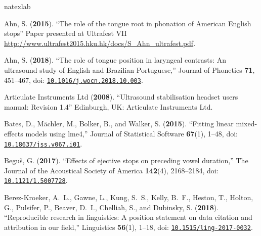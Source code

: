\documentclass[preprint]{JASAnew}
\begin{document}
\begin{thebibliography}{68}
\def\enquote#1{``#1,''}
\def\plainquote#1{``#1''}
\expandafter\ifx\csname natexlab\endcsname\relax\def\natexlab#1{#1}\fi
\providecommand{\dourl}[1]{\href{http://#1}{\nolinkurl{#1}}}
\providecommand{\bibinfo}[2]{#2}
\providecommand{\noopsort}[1]{}
\providecommand{\switchargs}[2]{#2#1}
  \def\eatspace #1{#1}
\providecommand{\dodoi}[1]{doi: \href{http://dx.doi.org/#1}{\nolinkurl{#1}}}

\bibinfo{author}{Ahn, S.} (\textbf{\bibinfo{year}{2015}}).
  \plainquote{\bibinfo{title}{The role of the tongue root in phonation of
  {A}merican {E}nglish stops}} \bibinfo{howpublished}{Paper presented at
  Ultrafest VII
  \url{http://www.ultrafest2015.hku.hk/docs/S_Ahn_ultrafest.pdf}}.

\bibinfo{author}{Ahn, S.} (\textbf{\bibinfo{year}{2018}}).
  \enquote{\bibinfo{title}{The role of tongue position in laryngeal contrasts:
  An ultrasound study of {E}nglish and {B}razilian {P}ortuguese}}
  \bibinfo{journal}{Journal of Phonetics} \textbf{71},
  \bibinfo{pages}{451--467}, \dodoi{10.1016/j.wocn.2018.10.003}.

\bibinfo{author}{{Articulate Instruments Ltd{\texttrademark}}}
  (\textbf{\bibinfo{year}{2008}}). \plainquote{\bibinfo{title}{Ultrasound
  stabilisation headset users manual: Revision 1.4}}
  \bibinfo{howpublished}{Edinburgh, UK: Articulate Instruments Ltd}.

\bibinfo{author}{Bates, D.}, \bibinfo{author}{M{\"a}chler, M.},
  \bibinfo{author}{Bolker, B.},  and \bibinfo{author}{Walker, S.}
  (\textbf{\bibinfo{year}{2015}}). \enquote{\bibinfo{title}{Fitting linear
  mixed-effects models using lme4}} \bibinfo{journal}{Journal of Statistical
  Software} \textbf{67}(1), \bibinfo{pages}{1--48},
  \dodoi{10.18637/jss.v067.i01}.

\bibinfo{author}{Begu{\v s}, G.} (\textbf{\bibinfo{year}{2017}}).
  \enquote{\bibinfo{title}{Effects of ejective stops on preceding vowel
  duration}} \bibinfo{journal}{The Journal of the Acoustical Society of
  America} \textbf{142}(4), \bibinfo{pages}{2168--2184},
  \dodoi{10.1121/1.5007728}.

\bibinfo{author}{Berez-Kroeker, A.~L.}, \bibinfo{author}{Gawne, L.},
  \bibinfo{author}{Kung, S.~S.}, \bibinfo{author}{Kelly, B.~F.},
  \bibinfo{author}{Heston, T.}, \bibinfo{author}{Holton, G.},
  \bibinfo{author}{Pulsifer, P.}, \bibinfo{author}{Beaver, D.~I.},
  \bibinfo{author}{Chelliah, S.},  and \bibinfo{author}{Dubinsky, S.}
  (\textbf{\bibinfo{year}{2018}}). \enquote{\bibinfo{title}{Reproducible
  research in linguistics: A position statement on data citation and
  attribution in our field}} \bibinfo{journal}{Linguistics} \textbf{56}(1),
  \bibinfo{pages}{1--18}, \dodoi{10.1515/ling-2017-0032}.


\end{thebibliography}
\end{document}
